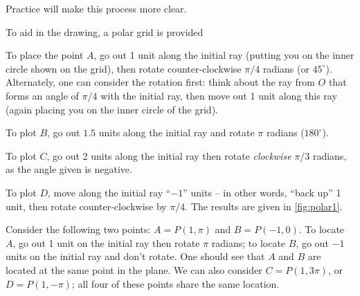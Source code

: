 
Practice will make this process more clear.

{To aid in the drawing, a polar grid is provided
%
\parbox[t][0pt]{0pt}{%
\iflatexml
 }%
%
To place the point $A$, go out 1 unit along the initial ray (putting you on the inner circle shown on the grid), then rotate counter-clockwise $\pi/4$ radians (or $45^\circ$).  Alternately, one can consider the rotation first: think about the ray from $O$ that forms an angle of $\pi/4$ with the initial ray, then move out 1 unit along this ray (again placing you on the inner circle of the grid).

To plot $B$, go out $1.5$ units along the initial ray and rotate $\pi$ radians ($180^\circ$). 

To plot $C$, go out 2 units along the initial ray then rotate \textit{clockwise} $\pi/3$ radians, as the angle given is negative.

To plot $D$, move along the initial ray ``$-1$'' units -- in other words, ``back up'' 1 unit, then rotate counter-clockwise by $\pi/4$. The results are given in \autoref{fig:polar1}.}

Consider the following two points: $A = P(1,\pi)$ and $B = P(-1,0)$. To locate $A$, go out 1 unit on the initial ray then rotate $\pi$ radians; to locate $B$, go out $-1$ units on the initial ray and don't rotate. One should see that $A$ and $B$ are located at the same point in the plane. We can also consider $C=P(1,3\pi)$, or $D = P(1,-\pi)$; all four of these points share the same location. 


